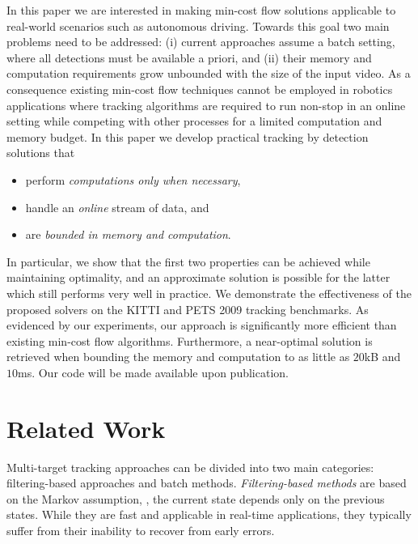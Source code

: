 \documentclass[10pt,twocolumn,letterpaper]{article}
\begin{document}
In this paper we are interested in making min-cost flow solutions applicable to real-world scenarios such as autonomous driving. Towards this goal two main problems need to be addressed:  (i) current approaches assume a batch setting, where all detections must be available a priori, and  (ii) their memory and computation requirements grow unbounded with the size of the input video.
As a consequence existing min-cost flow techniques cannot be  employed in robotics applications where tracking algorithms are required to run non-stop in an online setting while competing with other processes for a limited computation and memory budget. 
In this paper we develop practical tracking by detection solutions that 
\begin{itemize}
\item perform {\it computations only when necessary},
\item handle an  {\it online} stream of data, and
\item are {\it  bounded in memory and computation}.
\end{itemize}
In particular,  we show that the first two properties can be achieved while maintaining  optimality, and an approximate solution is possible for the latter which still performs very well in practice. 
We demonstrate the effectiveness of the proposed solvers on the KITTI \cite{Geiger2012CVPR} and  PETS 2009 \cite{Ferryman2009PETS} tracking benchmarks. As evidenced by our experiments, our approach is significantly more efficient  than existing min-cost flow algorithms. Furthermore, a near-optimal solution is retrieved when bounding the memory and computation to as little as $20$kB and $10$ms. 
Our code will be made available upon publication. \section{Related Work}

Multi-target tracking approaches  can be divided into two main categories: filter\-ing-based approaches and batch methods. 
{\it Filtering-based methods} \cite{Mitzel2012ECCV,Breitenstein2011PAMI,Ess2009PAMI,Nam2014ECCV} are based on the Markov assumption, \ie, the current state depends only on the previous states. 
While they are fast and applicable in real-time applications, they typically suffer from their inability to recover from early errors.
\end{document}

